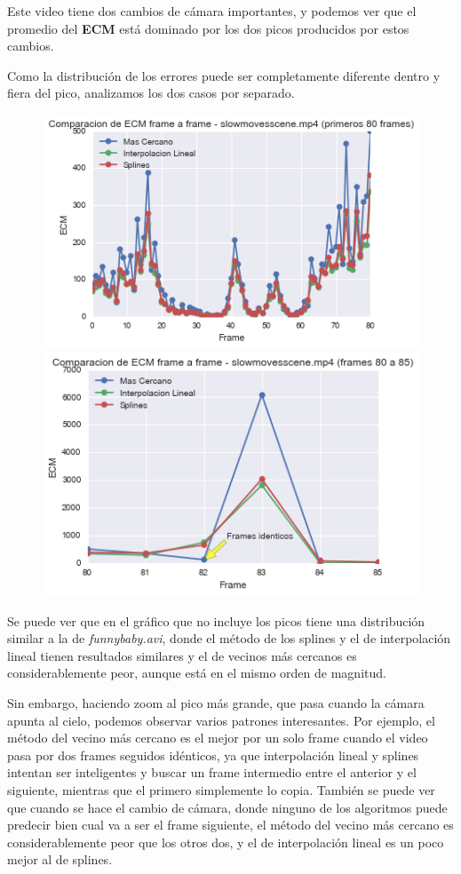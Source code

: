 Este video tiene dos cambios de c\'amara importantes, y podemos ver que el
promedio del \textbf{ECM} est\'a dominado por los dos picos producidos
por estos cambios.

Como la distribuci\'on de los errores puede ser completamente diferente dentro y
fiera del pico, analizamos los dos casos por separado.

\begin{figure}[H]
\centering
\includegraphics[width=.49\textwidth]{graficos/ecm_frame_slowmovescene_0_80.png}
\includegraphics[width=.49\textwidth]{graficos/ecm_frame_slowmovescene_80_85.png}
\end{figure}

Se puede ver que en el gr\'afico que no incluye los picos tiene una
distribuci\'on similar a la de \textit{funnybaby.avi}, donde el m\'etodo de los
splines y el de interpolaci\'on lineal tienen resultados similares y el de
vecinos m\'as cercanos es considerablemente peor, aunque est\'a en el mismo
orden de magnitud.

Sin embargo, haciendo zoom al pico m\'as grande, que pasa cuando la c\'amara
apunta al cielo, podemos observar varios patrones interesantes. Por ejemplo, el m\'etodo del
vecino m\'as cercano es el mejor por un solo frame cuando el video pasa por dos
frames seguidos id\'enticos, ya que interpolaci\'on lineal y splines
intentan ser inteligentes y buscar un frame intermedio entre el anterior y el
siguiente, mientras que el primero simplemente lo copia. Tambi\'en se puede ver
que cuando se hace el cambio de c\'amara, donde ninguno de los algoritmos puede
predecir bien cual va a ser el frame siguiente, el m\'etodo del vecino m\'as
cercano es considerablemente peor que los otros dos, y el de interpolaci\'on
lineal es un poco mejor al de splines.

